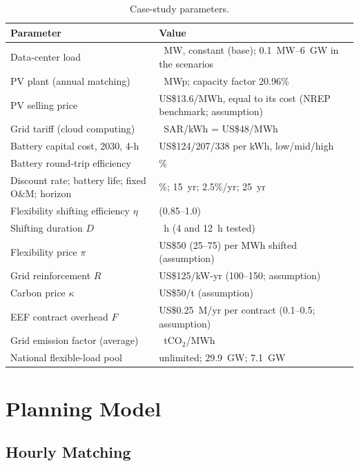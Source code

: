 \begin{table}[!htbp]
\centering
\caption{Case-study parameters.}
\label{tab:3-params}
\small
\renewcommand{\arraystretch}{1.15}
\begin{tabularx}{\textwidth}{>{\raggedright\arraybackslash}X>{\raggedright\arraybackslash}p{5.6cm}}
\toprule
\textbf{Parameter} & \textbf{Value} \\
\midrule
Data-center load & 100~MW, constant (base); 0.1~MW--6~GW in the scenarios \\
PV plant (annual matching) & 477~MWp; capacity factor 20.96\% \cite{pvgis} \\
PV selling price & US\$13.6/MWh, equal to its cost (NREP benchmark; assumption) \\
Grid tariff (cloud computing) & 0.18~SAR/kWh = US\$48/MWh \cite{kapsarcdc} \\
Battery capital cost, 2030, 4-h & US\$124/207/338 per kWh, low/mid/high \cite{nrelbess2025} \\
Battery round-trip efficiency & 90\% \\
Discount rate; battery life; fixed O\&M; horizon & 8\%; 15~yr; 2.5\%/yr; 25~yr \\
Flexibility shifting efficiency $\eta$ & 0.95 (0.85--1.0) \\
Shifting duration $D$ & 8~h (4 and 12~h tested) \\
Flexibility price $\pi$ & US\$50 (25--75) per MWh shifted (assumption) \\
Grid reinforcement $R$ & US\$125/kW-yr (100--150; assumption) \\
Carbon price $\kappa$ & US\$50/t (assumption) \\
EEF contract overhead $F$ & US\$0.25~M/yr per contract (0.1--0.5; assumption) \\
Grid emission factor (average) & 0.568~tCO$_2$/MWh \cite{kfupmghg} \\
National flexible-load pool & unlimited; 29.9~GW; 7.1~GW \cite{r23} \\
\bottomrule
\end{tabularx}
\end{table}

\section{Planning Model}\label{sec:3-5}

\subsection{Hourly Matching}

